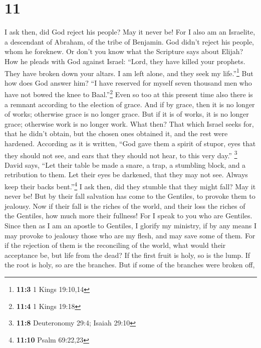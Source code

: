 \hypertarget{section-10}{%
\section{11}\label{section-10}}

 I ask then, did God reject his people? May it never be!
For I also am an Israelite, a descendant of Abraham, of the tribe of
Benjamin.  God didn't reject his people, whom he foreknew.
Or don't you know what the Scripture says about Elijah? How he pleads
with God against Israel:  ``Lord, they have killed your
prophets. They have broken down your altars. I am left alone, and they
seek my life.''\footnote{\textbf{11:3} 1 Kings 19:10,14} 
But how does God answer him? ``I have reserved for myself seven thousand
men who have not bowed the knee to Baal.''\footnote{\textbf{11:4} 1
  Kings 19:18}  Even so too at this present time also
there is a remnant according to the election of grace. 
And if by grace, then it is no longer of works; otherwise grace is no
longer grace. But if it is of works, it is no longer grace; otherwise
work is no longer work.  What then? That which Israel
seeks for, that he didn't obtain, but the chosen ones obtained it, and
the rest were hardened.  According as it is written, ``God
gave them a spirit of stupor, eyes that they should not see, and ears
that they should not hear, to this very day.'' \footnote{\textbf{11:8}
  Deuteronomy 29:4; Isaiah 29:10}  David says, ``Let their
table be made a snare, a trap, a stumbling block, and a retribution to
them.  Let their eyes be darkened, that they may not see.
Always keep their backs bent.''\footnote{\textbf{11:10} Psalm 69:22,23}
 I ask then, did they stumble that they might fall? May
it never be! But by their fall salvation has come to the Gentiles, to
provoke them to jealousy.  Now if their fall is the
riches of the world, and their loss the riches of the Gentiles, how much
more their fullness!  For I speak to you who are
Gentiles. Since then as I am an apostle to Gentiles, I glorify my
ministry,  if by any means I may provoke to jealousy
those who are my flesh, and may save some of them.  For
if the rejection of them is the reconciling of the world, what would
their acceptance be, but life from the dead?  If the
first fruit is holy, so is the lump. If the root is holy, so are the
branches.  But if some of the branches were broken off,
